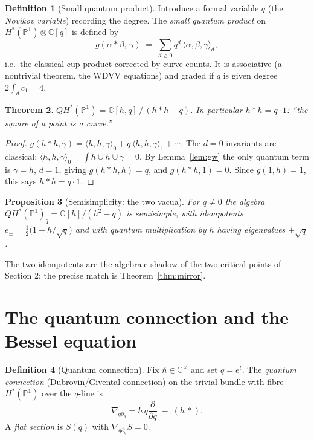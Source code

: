 \documentclass[11pt]{article}
\newtheorem{proposition}{Proposition}[section]
\newtheorem{theorem}[proposition]{Theorem}
\theoremstyle{definition}
\newtheorem{definition}[proposition]{Definition}
\theoremstyle{remark}
\newcommand{\C}{\mathbb{C}}
\newcommand{\PP}{\mathbb{P}}
\newcommand{\hbarr}{\hbar}
\begin{document}
\begin{definition}[Small quantum product]
Introduce a formal variable $q$ (the \emph{Novikov variable})
recording the degree. The \emph{small quantum product} on
$H^\ast(\PP^1) \otimes \C[q]$ is defined by
\[
  g(\alpha \ast \beta,\, \gamma)
  \;=\; \sum_{d \ge 0} q^d\,
  \langle \alpha, \beta, \gamma \rangle_d ,
\]
i.e.\ the classical cup product corrected by curve counts. It is
associative (a nontrivial theorem, the WDVV equations) and graded
if $q$ is given degree $2\!\int_d c_1 = 4$.
\end{definition}

\begin{theorem}\label{thm:qh}
$QH^\ast(\PP^1) = \C[h, q]\,/\,(h \ast h - q)$. In particular
$h \ast h = q\cdot 1$: ``the square of a point is a curve.''
\end{theorem}

\begin{proof}
$g(h \ast h, \gamma) = \langle h,h,\gamma\rangle_0 +
q\,\langle h,h,\gamma\rangle_1 + \cdots$. The $d = 0$ invariants
are classical: $\langle h,h,\gamma\rangle_0 = \int h\cup h\cup
\gamma = 0$. By Lemma~\ref{lem:gw} the only quantum term is
$\gamma = h$, $d = 1$, giving $g(h\ast h, h) = q$, and
$g(h \ast h, 1) = 0$. Since $g(1, h) = 1$, this says
$h \ast h = q \cdot 1$.
\end{proof}

\begin{proposition}[Semisimplicity: the two vacua]
For $q \ne 0$ the algebra $QH^\ast(\PP^1)_q =
\C[h]/(h^2 - q)$ is semisimple, with idempotents
$e_\pm = \tfrac12\bigl(1 \pm h/\sqrt q\bigr)$ and with quantum
multiplication by $h$ having eigenvalues $\pm\sqrt q$.
\end{proposition}

The two idempotents are the algebraic shadow of the two critical
points of Section 2; the precise match is
Theorem~\ref{thm:mirror}.

\section{The quantum connection and the Bessel equation}

\begin{definition}[Quantum connection]
Fix $\hbarr \in \C^\times$ and set $q = e^t$. The \emph{quantum
connection} (Dubrovin/Givental connection) on the trivial bundle
with fibre $H^\ast(\PP^1)$ over the $q$-line is
\[
  \nabla_{q\partial_q}
  = \hbarr\, q\frac{\partial}{\partial q} \;-\; (h\,\ast).
\]
A \emph{flat section} is $S(q)$ with $\nabla_{q\partial_q} S = 0$.
\end{definition}
\end{document}
